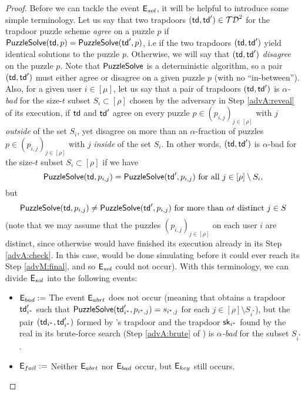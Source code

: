 \begin{proof}
  Before we can tackle the event \(\mathsf{E}_{sol}\),
  it will be helpful to introduce some simple terminology.
  Let us say that two trapdoors \((\mathsf{td},\mathsf{td}') \in \mathcal{TD}^{2}\) for the trapdoor puzzle scheme \TP
  \emph{agree} on a puzzle \(p\) if \(\mathsf{PuzzleSolve}(\mathsf{td},p) = \mathsf{PuzzleSolve}(\mathsf{td}',p)\),
  i.e if the two trapdoors \((\mathsf{td},\mathsf{td}')\) yield identical solutions to the puzzle \(p\).
  Otherwise, we will say that \((\mathsf{td},\mathsf{td}')\) \emph{disagree} on the puzzle \(p\).
  Note that \(\mathsf{PuzzleSolve}\) is a deterministic algorithm,
  so a pair \((\mathsf{td},\mathsf{td}')\) must either agree or disagree on a given puzzle \(p\) (with no ``in-between'').
  Also, for a given user \(i \in [\mu]\),
  let us say that a pair of trapdoors
  \((\mathsf{td},\mathsf{td}')\) is \emph{\(\alpha\)-bad}
  for the size-\(t\) subset \(S_{i} \subset [\rho]\)
  chosen by the adversary in Step \ref{advA:reveal} of its execution,
  if \(\mathsf{td}\) and \(\mathsf{td}'\) agree
  on every puzzle \(p \in (p_{i,j})_{j \in [\rho]}\)
  with \(j\) \emph{outside} of the set \(S_{i}\),
  yet disagree on more than an \(\alpha\)-fraction of puzzles
  \(p \in (p_{i,j})_{j \in [\rho]}\)
  with \(j\) \emph{inside} of the set \(S_{i}\).
  In other words, \((\mathsf{td},\mathsf{td}')\) is \(\alpha\)-bad for the size-\(t\) subset \(S_{i} \subset [\rho]\) if we have
  \[
    \mathsf{PuzzleSolve}(\mathsf{td},p_{i,j}) = \mathsf{PuzzleSolve}(\mathsf{td}',p_{i,j}) \text{ for all } j \in [\rho] \setminus S_{i},
  \]
  but
  \[
    \mathsf{PuzzleSolve}(\mathsf{td},p_{i,j}) \ne \mathsf{PuzzleSolve}(\mathsf{td}',p_{i,j}) \text{ for more than } \alpha t \text{ distinct } j \in S
  \]
  (note that we may assume that the puzzles \((p_{i,j})_{j \in [\rho]}\) on each user \(i\) are distinct,
  since otherwise \advA would have finished its execution already in its Step \ref{advA:check}.
  In this case, \redM would be done simulating \advA before it could ever reach its Step \ref{advM:final},
  and so \(\mathsf{E}_{sol}\) could not occur).
  With this terminology, we can divide \(\mathsf{E}_{sol}\) into the following events:
  \begin{itemize}[label={\textbullet},itemsep=0.1cm]
    \item \(\mathsf{E}_{bad} := \) The event \(\mathsf{E}_{abrt}\) does not occur
          (meaning that \redM obtains a trapdoor \(\mathsf{td}_{i^{*}}'\) such that
          \(\mathsf{PuzzleSolve}(\mathsf{td}_{i^{*}}',p_{i^{*},j}) = s_{i^{*},j}\) for each \(j \in [\rho] \setminus S_{i^{*}}\)),
          but the pair \((\mathsf{td}_{i^{*}}, \mathsf{td}_{i^{*}}')\) formed by \redM's trapdoor
          and the trapdoor \(\mathsf{sk}_{i^{*}}\) found by the real \advA in
          its brute-force search (Step \ref{advA:brute} of \advA)
          is \emph{\(\alpha\)-bad} for the subset \(S_{i^{*}}\).
    \item \(\mathsf{E}_{fail} := \) Neither \(\mathsf{E}_{abrt}\) nor \(\mathsf{E}_{bad}\) occur,
          but \(\mathsf{E}_{key}\) still occurs.
  \end{itemize}


\end{proof}

